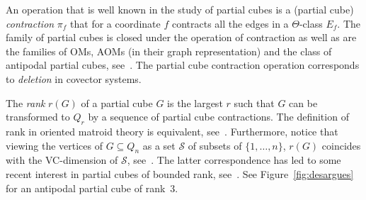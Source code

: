 \documentclass[final,11pt]{article}
\begin{document}
%

An operation that is well known in the study of partial cubes is a (partial cube) \emph{contraction} $\pi_f$ that for
a coordinate $f$ contracts all the edges in a $\Theta$-class $E_f$. The family of partial cubes is closed under the operation of contraction as well as are the families of OMs, AOMs (in their graph representation) and the class of antipodal partial cubes, see~\cite{Kna-17}.
The partial cube contraction operation corresponds to \emph{deletion} in covector systems. %

The \emph{rank} $r(G)$ of a partial cube $G$ is the largest $r$ such that $G$ can be transformed to $Q_r$ by a sequence of partial cube contractions. The definition of rank in oriented matroid theory is equivalent, see~\cite{daS-95,CKP22}. Furthermore, notice that viewing the vertices of $G\subseteq Q_n$ as a set $\mathcal{S}$ of subsets of $\{1,\ldots, n\}$, $r(G)$ coincides with the VC-dimension of $\mathcal{S}$, see~\cite{VC-15}. The latter correspondence has led to some recent interest in partial cubes of bounded rank, see~\cite{CKP20}. See Figure~\ref{fig:desargues} for an antipodal partial cube of rank~$3$.
\end{document}
